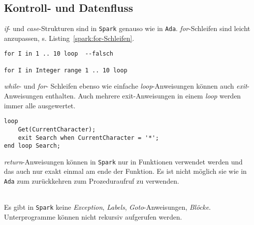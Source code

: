 \subsection{Kontroll- und Datenfluss}
\label{subsec:KontrollUndDatenfluss}
\textit{if}- und \textit{case}-Strukturen sind in \texttt{Spark} genauso wie in \texttt{Ada}. \textit{for}-Schleifen sind leicht anzupassen, s. Listing~\ref{spark:for-Schleifen}.
\begin{lstlisting}[caption={for-Schleifen}, label=spark:for-Schleifen]
for I in 1 .. 10 loop  --falsch

for I in Integer range 1 .. 10 loop
\end{lstlisting}

\textit{while}- und \textit{for}- Schleifen ebenso wie einfache \textit{loop}-Anweisungen können auch \textit{exit}-Anweisungen enthalten. Auch mehrere exit-Anweisungen in einem \textit{loop} werden immer alle ausgewertet.
\begin{lstlisting}[caption={exit in loop}, label=spark:exit in loop]
loop
	Get(CurrentCharacter);
	exit Search when CurrentCharacter = '*';
end loop Search;
\end{lstlisting}

\textit{return}-Anweisungen können in \texttt{Spark} nur in Funktionen verwendet werden und das auch nur exakt einmal am ende der Funktion. Es ist nicht möglich sie wie in \texttt{Ada} zum zurückkehren zum Prozeduraufruf zu verwenden.\\\


Es gibt in \texttt{Spark} keine \textit{Exception}, \textit{Labels}, \textit{Goto}-Anweisungen, \textit{Blöcke}. Unterprogramme können nicht rekursiv aufgerufen werden.